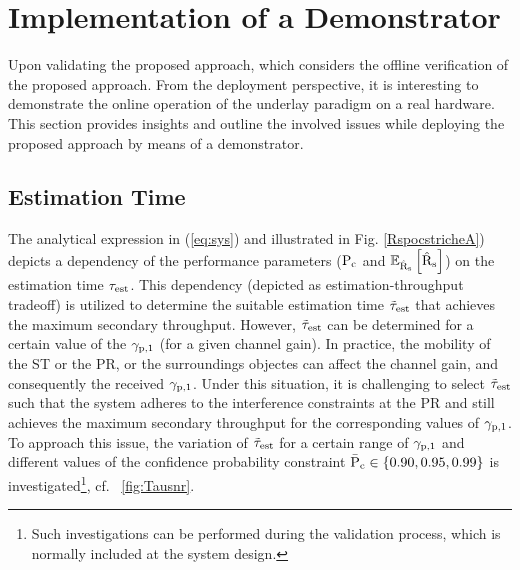 \section{Implementation of a Demonstrator}
\label{demo}
Upon validating the proposed approach, which considers the offline verification of the proposed approach. From the deployment perspective, it is interesting to demonstrate the online operation of the underlay paradigm on a real hardware. This section provides insights and outline the involved issues while deploying the proposed approach by means of a demonstrator. 

\subsection{Estimation Time}
\label{esttime}
The analytical expression in (\ref{eq:sys}) and illustrated in Fig. \ref{RspocstricheA}) depicts a dependency of the performance parameters ($\text{P}_{\text{c}}$ and ${\mathbb E}_{\hat{\text{{R}}}_{\text{s}}}\left[ \hat{\text{{R}}}_{\text{s}} \right]$) on the estimation time $\tau_{\text{est}}$. This dependency (depicted as estimation-throughput tradeoff) is utilized to determine the suitable estimation time $\tilde{\tau}_{\text{est}}$ that achieves the maximum secondary throughput. However, $\tilde{\tau}_{\text{est}}$ can be determined for a certain value of the ${\gamma}_{\text{p,1}}$ (for a given channel gain). In practice, the mobility of the ST or the PR, or the surroundings objectes can affect the channel gain, and consequently the received ${\gamma}_{\text{p,1}}$. Under this situation, it is challenging to select $\tilde{\tau}_{\text{est}}$ such that the system adheres to the interference constraints at the PR and still achieves the maximum secondary throughput for the corresponding values of ${\gamma}_{\text{p,1}}$. To approach this issue, the variation of $\tilde{\tau}_{\text{est}}$ for a certain range of ${\gamma}_{\text{p,1}}$ and different values of the confidence probability constraint $\bar{\text{P}}_{\text{c}} \in \{0.90, 0.95, 0.99\}$ is investigated\footnote{Such investigations can be performed during the validation process, which is normally included at the system design.}, cf. \figurename~\ref{fig:Tausnr}. %


